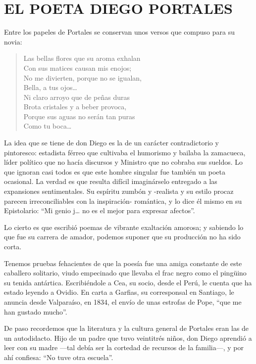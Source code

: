 \documentclass[10pt,twoside,openright]{memoir}
\begin{document}
\chapter{EL POETA DIEGO PORTALES}

Entre los papeles de Portales se conservan unos versos que compuso para
su novia:

\begin{verse}
Las bellas flores que su aroma exhalan\\
Con sus matices causan mis enojos;\\
No me divierten, porque no se igualan,\\
Bella, a tus ojos\ldots\\
Ni claro arroyo que de peñas duras\\
Brota cristales y a beber provoca,\\
Porque sus aguas no serán tan puras\\
Como tu boca\ldots
\end{verse}

La idea que se tiene de don Diego es la de un carácter contradictorio y
pintoresco: estadista férreo que cultivaba el humorismo y bailaba la
zamacueca, líder político que no hacía discursos y Ministro que no
cobraba sus sueldos. Lo que ignoran casi todos es que este hombre
singular fue también un poeta ocasional. La verdad es que resulta
difícil imaginárselo entregado a las expansiones sentimentales. Su
espíritu zumbón y -realista y su estilo procaz parecen irreconciliables
con la inspiración- romántica, y lo dice él mismo en su Epistolario: ``Mi
genio j\ldots{} no es el mejor para expresar afectos''.

Lo cierto es que escribió poemas de vibrante exaltación amorosa; y
sabiendo lo que fue su carrera de amador, podemos suponer que su
producción no ha sido corta.

Tenemos pruebas fehacientes de que la poesía fue una amiga constante de
este caballero solitario, viudo empecinado que llevaba el frac negro
como el pingüino su tenida antártica. Escribiéndole a Cea, su socio,
desde el Perú, le cuenta que ha estado leyendo a Ovidio. En carta a
Garfias, su corresponsal en Santiago, le anuncia desde Valparaíso, en
1834, el envío de unas estrofas de Pope, ``que me han gustado mucho''.

De paso recordemos que la literatura y la cultura general de Portales
eran las de un autodidacto. Hijo de un padre que tuvo veintitrés niños,
don Diego aprendió a leer con su madre ---tal debía ser la cortedad de
recursos de la familia---, y por ahí confiesa: ``No tuve otra escuela''.
\end{document}

